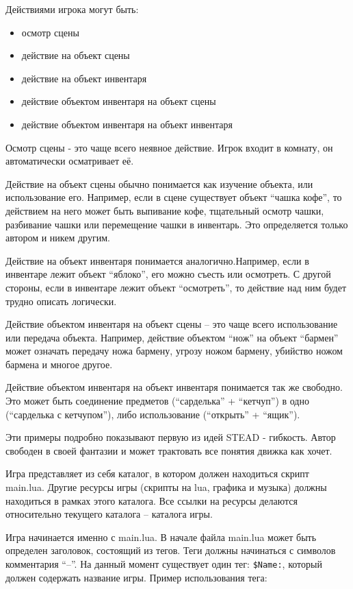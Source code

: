 \documentclass[a4paper,12pt]{article}
\begin{document}
Действиями игрока могут быть:

\begin{itemize}
\item {осмотр сцены}
\item {действие на объект сцены}
\item {действие на объект инвентаря}
\item {действие объектом инвентаря на объект сцены}
\item {действие объектом инвентаря на объект инвентаря}
\end{itemize}

Осмотр сцены - это чаще всего неявное действие. Игрок входит в комнату, он автоматически осматривает её.

Действие на объект сцены обычно понимается как изучение объекта, или использование его. Например, если в сцене существует объект ``чашка кофе'', то действием на него может быть выпивание кофе, тщательный осмотр чашки, разбивание чашки или перемещение чашки в инвентарь. Это определяется только автором и никем другим.

Действие на объект инвентаря понимается аналогично.Например, если в инвентаре лежит объект ``яблоко'', его можно съесть или осмотреть. С другой стороны, если в инвентаре лежит объект ``осмотреть'', то действие над ним будет трудно описать логически.

Действие объектом инвентаря на объект сцены -- это чаще всего использование или передача объекта. Например, действие объектом ``нож'' на объект ``бармен'' может означать передачу ножа бармену, угрозу ножом бармену, убийство ножом бармена и многое другое.

Действие объектом инвентаря на объект инвентаря понимается так же свободно. Это может быть соединение предметов (``сарделька'' + ``кетчуп'') в одно (``сарделька с кетчупом''), либо использование (``открыть'' + ``ящик'').

Эти примеры подробно показывают первую из идей STEAD - гибкость. Автор свободен в своей фантазии и может трактовать все понятия движка как хочет.

Игра представляет из себя каталог, в котором должен находиться скрипт main.lua. Другие ресурсы игры (скрипты на lua, графика и музыка) должны находиться в рамках этого каталога. Все ссылки на ресурсы делаются относительно текущего каталога -- каталога игры.

Игра начинается именно с main.lua. В начале файла main.lua может быть определен заголовок, состоящий из тегов. Теги должны начинаться с символов комментария ``--''. На данный момент существует один тег: \verb/$Name:/, который должен содержать название игры. Пример использования тега:
\end{document}
